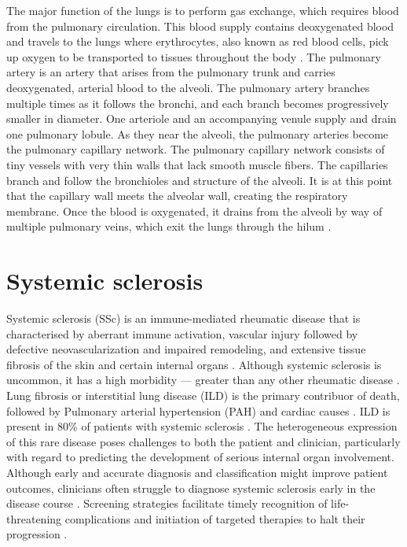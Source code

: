 The major function of the lungs is to perform gas exchange, which requires blood from the pulmonary circulation. This blood supply contains deoxygenated blood and travels to the lungs where erythrocytes, also known as red blood cells, pick up oxygen to be transported to tissues throughout the body \cite{aung2019overview}. The pulmonary artery is an artery that arises from the pulmonary trunk and carries deoxygenated, arterial blood to the alveoli. The pulmonary artery branches multiple times as it follows the bronchi, and each branch becomes progressively smaller in diameter. One arteriole and an accompanying venule supply and drain one pulmonary lobule. As they near the alveoli, the pulmonary arteries become the pulmonary capillary network. The pulmonary capillary network consists of tiny vessels with very thin walls that lack smooth muscle fibers. The capillaries branch and follow the bronchioles and structure of the alveoli. It is at this point that the capillary wall meets the alveolar wall, creating the respiratory membrane. Once the blood is oxygenated, it drains from the alveoli by way of multiple pulmonary veins, which exit the lungs through the hilum \cite{aung2019overview, martini2005anatomy}.

\section{Systemic sclerosis}
Systemic sclerosis (SSc) is an immune-mediated rheumatic disease that is characterised by aberrant immune activation, vascular injury followed by defective neovascularization and impaired remodeling, and extensive tissue fibrosis of the skin and certain internal organs \cite{denton2017systemic,asano2018systemic}. Although systemic sclerosis is uncommon, it has a high morbidity — greater than any other rheumatic disease \cite{denton2017systemic}.   Lung fibrosis or interstitial lung disease (ILD) is the primary contribuor of death, followed by Pulmonary arterial hypertension (PAH) and cardiac causes  \cite{Acharya2013, steele2012clinical}. ILD is present in 80\% of patients with systemic sclerosis \cite{codes2023systemic}. The heterogeneous expression of this rare disease poses challenges to both the patient and clinician, particularly with regard to predicting the development of serious internal organ involvement. Although early and accurate diagnosis and classification might improve patient outcomes, clinicians often struggle to diagnose systemic sclerosis early in the disease course \cite{volkmann2023systemic}.  Screening strategies facilitate timely recognition of life-threatening complications and initiation of targeted therapies to halt their progression \cite{allanore2015systemic}.

